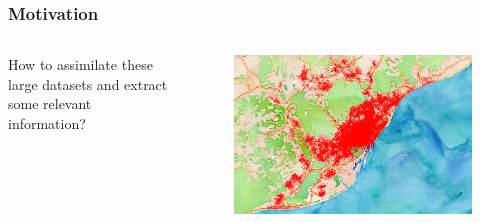 \documentclass[hyperref={pdfpagelabels=true}]{beamer}
\begin{document}

\begin{frame}
\frametitle{Motivation}
\begin{columns}
  \begin{column}{0.5\textwidth}
      How to assimilate these large datasets and extract some relevant information?
  \end{column}
  \begin{column}{0.5\textwidth}      
	\begin{figure}   
	  \includegraphics[width=\textwidth]{bigdata2.png}   
	\end{figure}     
  \end{column}  
\end{columns}
\end{frame}
\end{document}
